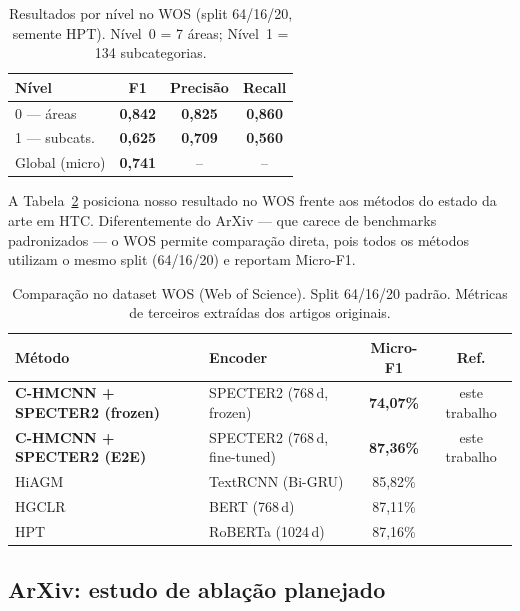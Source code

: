 \documentclass[11pt,a4paper,twoside]{article}
\newcommand{\ours}[1]{\textcolor{ourblue}{\textbf{#1}}}
\begin{document}
\begin{table}[htbp]
\centering
\caption{Resultados por nível no WOS (split 64/16/20, semente HPT).
         Nível~0 = 7 áreas; Nível~1 = 134 subcategorias.}
\label{tab:wos_levels}
\begin{tabular}{lccc}
\toprule
\textbf{Nível} & \textbf{F1} & \textbf{Precisão} & \textbf{Recall} \\
\midrule
0 --- áreas      & \ours{0,842} & \ours{0,825} & \ours{0,860} \\
1 --- subcats.   & \ours{0,625} & \ours{0,709} & \ours{0,560} \\
\midrule
Global (micro)   & \ours{0,741} & --              & -- \\
\bottomrule
\end{tabular}
\end{table}

A Tabela~\ref{tab:wos_sota} posiciona nosso resultado no WOS frente aos métodos
do estado da arte em HTC. Diferentemente do ArXiv --- que carece de benchmarks
padronizados --- o WOS permite comparação direta, pois todos os métodos utilizam
o mesmo split (64/16/20) e reportam Micro-F1.

\begin{table}[htbp]
\centering
\footnotesize
\setlength{\tabcolsep}{4pt}
\caption{Comparação no dataset WOS (Web of Science). Split 64/16/20 padrão.
         Métricas de terceiros extraídas dos artigos originais.}
\label{tab:wos_sota}
\begin{tabular}{llcc}
\toprule
\textbf{Método} & \textbf{Encoder} & \textbf{Micro-F1} & \textbf{Ref.} \\
\midrule
\ours{C-HMCNN + SPECTER2 (frozen)} & SPECTER2 (768\,d, frozen)
    & \ours{74,07\%} & este trabalho \\
\ours{C-HMCNN + SPECTER2 (E2E)}   & SPECTER2 (768\,d, fine-tuned)
    & \ours{87,36\%} & este trabalho \\
\midrule
HiAGM                      & TextRCNN (Bi-GRU)
    & 85,82\%   & \cite{zhou2020hiagm} \\
HGCLR                      & BERT (768\,d)
    & 87,11\%   & \cite{wang2022hgclr} \\
HPT                        & RoBERTa (1024\,d)
    & 87,16\%   & \cite{wang2022hpt} \\
\bottomrule
\end{tabular}
\end{table}

\subsection{ArXiv: estudo de ablação planejado}
\end{document}
